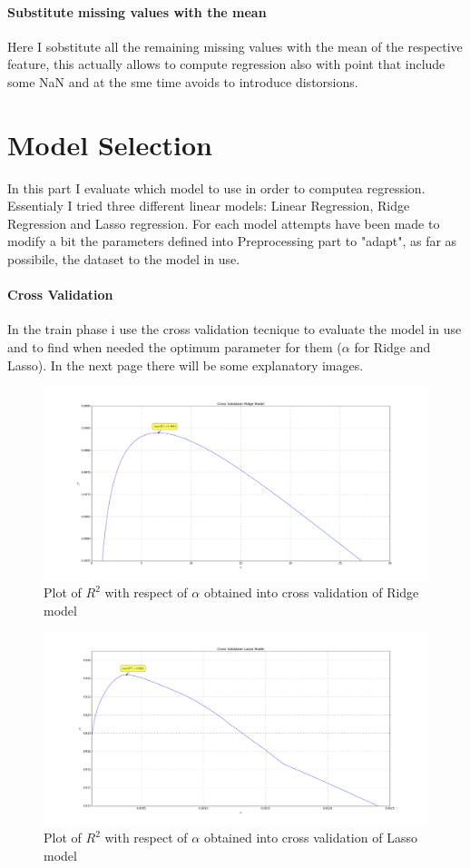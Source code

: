 \documentclass[a4paper, 11pt]{article}
\begin{document}
\paragraph{Substitute missing values with the mean}
Here I sobstitute all the remaining missing values with the mean of the respective feature, this actually allows to compute regression also with point that include some NaN and at the sme time avoids to introduce distorsions. 

\section{Model Selection}
In this part I evaluate which model to use in order to computea regression. Essentialy I tried three different linear models: Linear Regression, Ridge Regression and Lasso regression. For each model attempts have been made to modify a bit the parameters defined into Preprocessing part to "adapt", as far as possibile, the dataset to  the model in use. 
\paragraph{Cross Validation}
In the train phase i use the cross validation tecnique to evaluate the model in use and to find when needed the optimum parameter for them ($\alpha$ for Ridge and Lasso). In the next page there will be some explanatory images.

\begin{figure}[h]
\caption{Plot of $R^2$ with respect of $\alpha$ obtained into cross validation of Ridge model}
\includegraphics[width=21cm]{R2ridge.png}
\centering
\end{figure}

\begin{figure}[h]
\caption{Plot of $R^2$ with respect of $\alpha$ obtained into cross validation of Lasso model}
\includegraphics[width=21cm]{R2lasso.png}
\centering
\end{figure}
\end{document}

